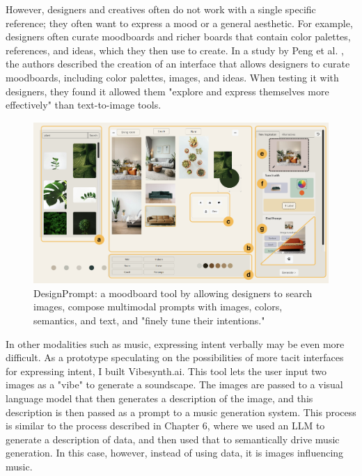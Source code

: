 However, designers and creatives often do not work with a single specific reference; they often want to express a mood or a general aesthetic. For example, designers often curate moodboards and richer boards that contain color palettes, references, and ideas, which they then use to create. In a study by Peng et al. \cite{Peng2024-tr}, the authors described the creation of an interface that allows designers to curate moodboards, including color palettes, images, and ideas. When testing it with designers, they found it allowed them "explore and express themselves more effectively" than text-to-image tools.

\begin{figure}
    \centering
    \includegraphics[width=1\linewidth]{designprompt.png}
    \caption{DesignPrompt: a moodboard tool by \cite{Peng2024-tr} allowing designers to search images, compose multimodal prompts with images, colors, semantics, and text, and "finely tune their intentions."}
    \label{fig:enter-label}
\end{figure}

In other modalities such as music, expressing intent verbally may be even more difficult. As a prototype speculating on the possibilities of more tacit interfaces for expressing intent, I built Vibesynth.ai. This tool lets the user input two images as a "vibe" to generate a soundscape. The images are passed to a visual language model that then generates a description of the image, and this description is then passed as a prompt to a music generation system. This process is similar to the process described in Chapter 6, where we used an LLM to generate a description of data, and then used that to semantically drive music generation. In this case, however, instead of using data, it is images influencing music.

